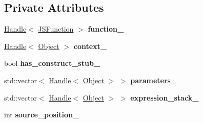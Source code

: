 \subsection*{Private Attributes}
\begin{DoxyCompactItemize}
\item 
\hyperlink{classv8_1_1internal_1_1_handle}{Handle}$<$ \hyperlink{classv8_1_1internal_1_1_j_s_function}{J\+S\+Function} $>$ {\bfseries function\+\_\+}\hypertarget{classv8_1_1internal_1_1_deoptimized_frame_info_a186b1e15775630d7ffc4cb06e9ef9c08}{}\label{classv8_1_1internal_1_1_deoptimized_frame_info_a186b1e15775630d7ffc4cb06e9ef9c08}

\item 
\hyperlink{classv8_1_1internal_1_1_handle}{Handle}$<$ \hyperlink{classv8_1_1internal_1_1_object}{Object} $>$ {\bfseries context\+\_\+}\hypertarget{classv8_1_1internal_1_1_deoptimized_frame_info_ab7e484d05e9dc767a4d77de1ae4986fa}{}\label{classv8_1_1internal_1_1_deoptimized_frame_info_ab7e484d05e9dc767a4d77de1ae4986fa}

\item 
bool {\bfseries has\+\_\+construct\+\_\+stub\+\_\+}\hypertarget{classv8_1_1internal_1_1_deoptimized_frame_info_ab4dbc581946a7975fd7a04bff44db8a5}{}\label{classv8_1_1internal_1_1_deoptimized_frame_info_ab4dbc581946a7975fd7a04bff44db8a5}

\item 
std\+::vector$<$ \hyperlink{classv8_1_1internal_1_1_handle}{Handle}$<$ \hyperlink{classv8_1_1internal_1_1_object}{Object} $>$ $>$ {\bfseries parameters\+\_\+}\hypertarget{classv8_1_1internal_1_1_deoptimized_frame_info_a238c860a7a31bfb48f824bce135f6302}{}\label{classv8_1_1internal_1_1_deoptimized_frame_info_a238c860a7a31bfb48f824bce135f6302}

\item 
std\+::vector$<$ \hyperlink{classv8_1_1internal_1_1_handle}{Handle}$<$ \hyperlink{classv8_1_1internal_1_1_object}{Object} $>$ $>$ {\bfseries expression\+\_\+stack\+\_\+}\hypertarget{classv8_1_1internal_1_1_deoptimized_frame_info_aeee625f6a11f9854ac1cb1f1ad61b8c1}{}\label{classv8_1_1internal_1_1_deoptimized_frame_info_aeee625f6a11f9854ac1cb1f1ad61b8c1}

\item 
int {\bfseries source\+\_\+position\+\_\+}\hypertarget{classv8_1_1internal_1_1_deoptimized_frame_info_a2574cac3b30706c3478ca8423c5bb970}{}\label{classv8_1_1internal_1_1_deoptimized_frame_info_a2574cac3b30706c3478ca8423c5bb970}

\end{DoxyCompactItemize}
